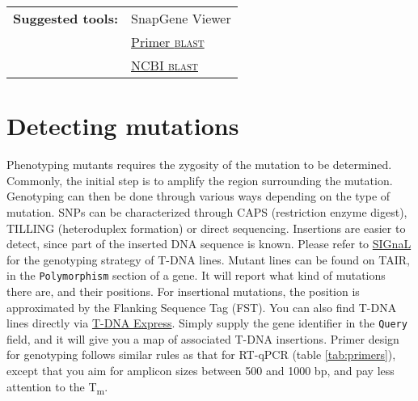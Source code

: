 \documentclass[11pt]{article}
\begin{document}
	\vspace*{\baselineskip}

	\noindent\begin{tabular}{@{}ll}
		\textbf{Suggested tools:} & SnapGene Viewer \\
		& \href{https://www.ncbi.nlm.nih.gov/tools/primer-blast/}{Primer \textsc{blast}} \\
		& \href{https://blast.ncbi.nlm.nih.gov/Blast.cgi}{NCBI \textsc{blast}} \\
	\end{tabular} 
	
	\section{Detecting mutations\label{sec:mut}}
 	Phenotyping mutants requires the zygosity of the mutation to be determined. 
 	Commonly, the initial step is to amplify the region surrounding the mutation. 
 	Genotyping can then be done through various ways depending on the type of mutation. 
 	SNPs can be characterized through CAPS (restriction enzyme digest), TILLING (heteroduplex formation) or direct sequencing. 
 	Insertions are easier to detect, since part of the inserted DNA sequence is known. Please refer to \href{http://signal.salk.edu/tdnaprimers.2.html}{SIGnaL} for the genotyping strategy of T-DNA lines.
 	Mutant lines can be found on TAIR, in the \texttt{Polymorphism} section of a gene. 
 	It will report what kind of mutations there are, and their positions. 
 	For insertional mutations, the position is approximated by the Flanking Sequence Tag (FST). 
 	You can also find T-DNA lines directly via  \href{http://signal.salk.edu/cgi-bin/tdnaexpress}{T-DNA Express}. 
 	Simply supply the gene identifier in the \texttt{Query} field, and it will give you a map of associated T-DNA insertions.
 	Primer design for genotyping follows similar rules as that for RT-qPCR (table \ref{tab:primers}), except that you aim for amplicon sizes between 500 and 1000 bp, and pay less attention to the T\textsubscript{m}.
 	
\end{document}
